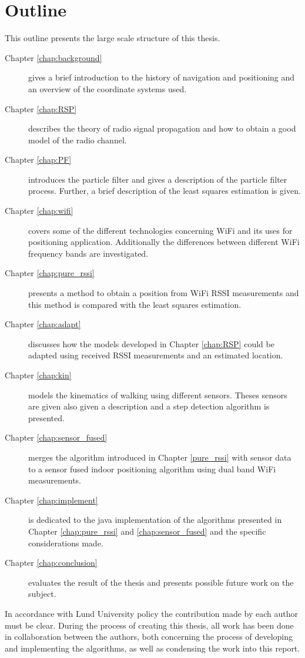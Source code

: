 \documentclass{LTHthesis}
\begin{document}
\section{Outline}
%
This outline presents the large scale structure of this thesis.
%
\begin{description}
\item[Chapter \ref{chap:background}] gives a brief introduction to the history of navigation and positioning and an overview of the coordinate systems used.  
%
\item[Chapter \ref{chap:RSP}] describes the theory of radio signal propagation and how to obtain a good model of the radio channel. 
%
\item[Chapter \ref{chap:PF}] introduces the particle filter and gives a description of the particle filter process. Further, a brief description of the least squares estimation is given. 
%
\item[Chapter \ref{chap:wifi}] covers some of the different technologies concerning WiFi and its uses for positioning application. Additionally the differences between different WiFi frequency bands are investigated. 
%
\item[Chapter \ref{chap:pure_rssi}] presents a method to obtain a position from WiFi RSSI measurements and this method is compared with the least squares estimation.  
%
\item[Chapter \ref{chap:adapt}] discusses how the models developed in Chapter \ref{chap:RSP} could be adapted using received RSSI measurements and an estimated location. 
%
\item[Chapter \ref{chap:kin}] models the kinematics of walking using different sensors. Theses sensors are given also given a description and a step detection algorithm is presented. 
%
\item[Chapter \ref{chap:sensor_fused}] merges the algorithm introduced in Chapter \ref{pure_rssi} with sensor data to a sensor fused indoor positioning algorithm using dual band WiFi measurements.
%
\item[Chapter \ref{chap:implement}] is dedicated to the java implementation of the algorithms presented in Chapter \ref{chap:pure_rssi} and \ref{chap:sensor_fused} and the specific considerations made. 
%
\item[Chapter \ref{chap:conclusion}] evaluates the result of the thesis and presents possible future work on the subject. 
%
\end{description}
%
In accordance with Lund University policy the contribution made by each author must be clear. During the process of creating this thesis, all work has been done in collaboration between the authors, both concerning the process of developing and implementing the algorithms, as well as condensing the work into this report. 
%
\end{document}

